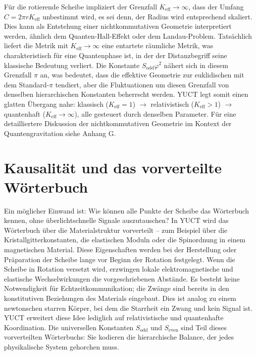 \documentclass[12pt,a4paper]{article}
\newcommand{\Sodd}{S_{\mathrm{odd}}}
\newcommand{\Seven}{S_{\mathrm{even}}}
\begin{document}
	Für die rotierende Scheibe impliziert der Grenzfall \(K_{\mathrm{eff}} \to \infty\), dass der Umfang \(C = 2\pi r K_{\mathrm{eff}}\) unbestimmt wird, es sei denn, der Radius wird entsprechend skaliert. Dies kann als Entstehung einer nichtkommutativen Geometrie interpretiert werden, ähnlich dem Quanten-Hall-Effekt oder dem Landau-Problem. Tatsächlich liefert die Metrik mit \(K_{\mathrm{eff}} \to \infty\) eine entartete räumliche Metrik, was charakteristisch für eine Quantenphase ist, in der der Distanzbegriff seine klassische Bedeutung verliert. Die Konstante \(\Sodd \varphi^2\) nähert sich in diesem Grenzfall \(\pi\) an, was bedeutet, dass die effektive Geometrie zur euklidischen mit dem Standard-\(\pi\) tendiert, aber die Fluktuationen um diesen Grenzfall von denselben hierarchischen Konstanten beherrscht werden. YUCT legt somit einen glatten Übergang nahe: klassisch (\(K_{\mathrm{eff}}=1\)) \(\rightarrow\) relativistisch (\(K_{\mathrm{eff}}>1\)) \(\rightarrow\) quantenhaft (\(K_{\mathrm{eff}}\to\infty\)), alle gesteuert durch denselben Parameter. Für eine detailliertere Diskussion der nichtkommutativen Geometrie im Kontext der Quantengravitation siehe Anhang G.
	
	\section{Kausalität und das vorverteilte Wörterbuch}
	\label{sec:causality}
	
	Ein möglicher Einwand ist: Wie können alle Punkte der Scheibe das Wörterbuch kennen, ohne überlichtschnelle Signale auszutauschen? In YUCT wird das Wörterbuch über die Materialstruktur vorverteilt – zum Beispiel über die Kristallgitterkonstanten, die elastischen Moduln oder die Spinordnung in einem magnetischen Material. Diese Eigenschaften werden bei der Herstellung oder Präparation der Scheibe lange vor Beginn der Rotation festgelegt. Wenn die Scheibe in Rotation versetzt wird, erzwingen lokale elektromagnetische und elastische Wechselwirkungen die vorgeschriebenen Abstände. Es besteht keine Notwendigkeit für Echtzeitkommunikation; die Zwänge sind bereits in den konstitutiven Beziehungen des Materials eingebaut. Dies ist analog zu einem newtonschen starren Körper, bei dem die Starrheit ein Zwang und kein Signal ist. YUCT erweitert diese Idee lediglich auf relativistische und quantenhafte Koordination. Die universellen Konstanten \(\Sodd\) und \(\Seven\) sind Teil dieses vorverteilten Wörterbuchs: Sie kodieren die hierarchische Balance, der jedes physikalische System gehorchen muss.
	
\end{document}
